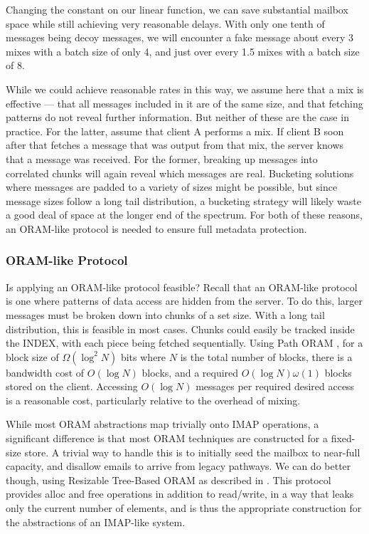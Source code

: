 \documentclass[pageno]{jpaper}
\begin{document}
Changing the constant on our linear function, we can save substantial mailbox space while still achieving very reasonable delays. With only one tenth of messages being decoy messages, we will encounter a fake message about every 3 mixes with a batch size of only 4, and just over every 1.5 mixes with a batch size of 8.

While we could achieve reasonable rates in this way, we assume here that a mix is effective \---- that all messages included in it are of the same size, and that fetching patterns do not reveal further information. But neither of these are the case in practice. For the latter, assume that client A performs a mix. If client B soon after that fetches a message that was output from that mix, the server knows that a message was received. For the former, breaking up messages into correlated chunks will again reveal which messages are real. Bucketing solutions where messages are padded to a variety of sizes might be possible, but since message sizes follow a long tail distribution, a bucketing strategy will likely waste a good deal of space at the longer end of the spectrum. For both of these reasons, an ORAM-like protocol is needed to ensure full metadata protection.


\subsubsection{ORAM-like Protocol}

Is applying an ORAM-like protocol feasible? Recall that an ORAM-like protocol is one where patterns of data access are hidden from the server. To do this, larger messages must be broken down into chunks of a set size. With a long tail distribution, this is feasible in most cases. Chunks could easily be tracked inside the INDEX, with each piece being fetched sequentially. Using Path ORAM \cite{stefanov2013path}, for a block size of $\Omega (\log ^2 N)$ bits where $N$ is the total number of blocks, there is a bandwidth cost of $O(\log N)$ blocks, and a required $O(\log N)\omega(1)$ blocks stored on the client. Accessing $O(\log N)$ messages per required desired access is a reasonable cost, particularly relative to the overhead of mixing.

While most ORAM abstractions map trivially onto IMAP operations, a significant difference is that most ORAM techniques are constructed for a fixed-size store. A trivial way to handle this is to initially seed the mailbox to near-full capacity, and disallow emails to arrive from legacy pathways. We can do better though, using Resizable Tree-Based ORAM as described in \cite{moatazresizable}. This protocol provides alloc and free operations in addition to read/write, in a way that leaks only the current number of elements, and is thus the appropriate construction for the abstractions of an IMAP-like system.
\end{document}
